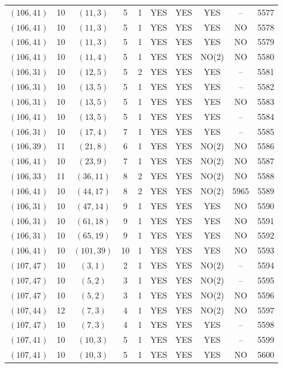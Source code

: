 \begin{longtable}{|c|c|c|c|c|c|c|c|c|c|}
$(106, 41)$ & 10 & $(11, 3)$ & 5 & 1 & YES & YES & YES & -- & 5577\\
$(106, 41)$ & 10 & $(11, 3)$ & 5 & 1 & YES & YES & YES & NO & 5578\\
$(106, 41)$ & 10 & $(11, 3)$ & 5 & 1 & YES & YES & YES & NO & 5579\\
$(106, 41)$ & 10 & $(11, 4)$ & 5 & 1 & YES & YES & NO(2) & NO & 5580\\
$(106, 31)$ & 10 & $(12, 5)$ & 5 & 2 & YES & YES & YES & -- & 5581\\
$(106, 31)$ & 10 & $(13, 5)$ & 5 & 1 & YES & YES & YES & -- & 5582\\
$(106, 31)$ & 10 & $(13, 5)$ & 5 & 1 & YES & YES & YES & NO & 5583\\
$(106, 41)$ & 10 & $(13, 5)$ & 5 & 1 & YES & YES & YES & -- & 5584\\
$(106, 31)$ & 10 & $(17, 4)$ & 7 & 1 & YES & YES & YES & -- & 5585\\
$(106, 39)$ & 11 & $(21, 8)$ & 6 & 1 & YES & YES & NO(2) & NO & 5586\\
$(106, 41)$ & 10 & $(23, 9)$ & 7 & 1 & YES & YES & NO(2) & NO & 5587\\
$(106, 33)$ & 11 & $(36, 11)$ & 8 & 2 & YES & YES & NO(2) & NO & 5588\\
$(106, 41)$ & 10 & $(44, 17)$ & 8 & 2 & YES & YES & NO(2) & 5965 & 5589\\
$(106, 31)$ & 10 & $(47, 14)$ & 9 & 1 & YES & YES & YES & NO & 5590\\
$(106, 31)$ & 10 & $(61, 18)$ & 9 & 1 & YES & YES & YES & NO & 5591\\
$(106, 31)$ & 10 & $(65, 19)$ & 9 & 1 & YES & YES & YES & NO & 5592\\
$(106, 41)$ & 10 & $(101, 39)$ & 10 & 1 & YES & YES & YES & NO & 5593\\
$(107, 47)$ & 10 & $(3, 1)$ & 2 & 1 & YES & YES & NO(2) & -- & 5594\\
$(107, 47)$ & 10 & $(5, 2)$ & 3 & 1 & YES & YES & NO(2) & -- & 5595\\
$(107, 47)$ & 10 & $(5, 2)$ & 3 & 1 & YES & YES & NO(2) & NO & 5596\\
$(107, 44)$ & 12 & $(7, 3)$ & 4 & 1 & YES & YES & NO(2) & NO & 5597\\
$(107, 47)$ & 10 & $(7, 3)$ & 4 & 1 & YES & YES & YES & -- & 5598\\
$(107, 41)$ & 10 & $(10, 3)$ & 5 & 1 & YES & YES & YES & -- & 5599\\
$(107, 41)$ & 10 & $(10, 3)$ & 5 & 1 & YES & YES & YES & NO & 5600\\

\end{longtable}
